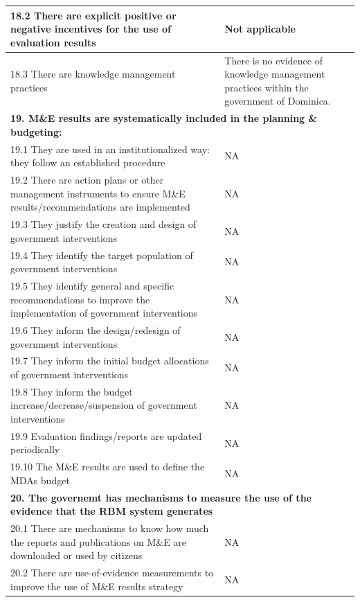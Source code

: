 \documentclass[
  10pt,
]{book}
\begin{document}
\begin{table}
\begin{tabular}[t]{l|l}
\hspace{1em}18.2 There are explicit positive or negative incentives for the use of evaluation results & Not applicable\\
\hline
\hspace{1em}18.3 There are knowledge management practices & There is no evidence of knowledge management practices within the government of Dominica.\\
\hline
\multicolumn{2}{l}{\textbf{19. M\&E results are systematically included in the planning \& budgeting:}}\\
\hline
\hspace{1em}19.1 They are used in an institutionalized way: they follow an established procedure & NA\\
\hline
\hspace{1em}19.2 There are action plans or other management instruments to ensure M\&E results/recommendations are implemented & NA\\
\hline
\hspace{1em}19.3 They justify the creation and design of government interventions & NA\\
\hline
\hspace{1em}19.4 They identify the target population of government interventions & NA\\
\hline
\hspace{1em}19.5 They identify general and specific recommendations to improve the implementation of government interventions & NA\\
\hline
\hspace{1em}19.6 They inform the design/redesign of government interventions & NA\\
\hline
\hspace{1em}19.7 They inform the initial budget allocations of government interventions & NA\\
\hline
\hspace{1em}19.8 They inform the budget increase/decrease/suspension of government interventions & NA\\
\hline
\hspace{1em}19.9 Evaluation findings/reports are updated periodically & NA\\
\hline
\hspace{1em}19.10 The M\&E results are used to define the MDAs budget & NA\\
\hline
\multicolumn{2}{l}{\textbf{20. The governemt has mechanisms to measure the use of the evidence that the RBM system generates}}\\
\hline
\hspace{1em}20.1 There are mechanisms to know how much the reports and publications on M\&E are downloaded or used by citizens & NA\\
\hline
\hspace{1em}20.2 There are use-of-evidence measurements to improve the use of M\&E results strategy & NA\\
\hline
\end{tabular}
\end{table}
\end{document}
